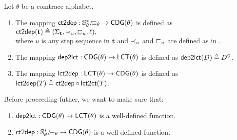 \documentclass{llncs}
\begin{document}
\begin{definition} Let $\theta$ be a comtrace alphabet. 
\begin{enumerate}
 \item The mapping  $\mathsf{ct2dep}:{\mathbb{S}_\theta^*}/\!{\equiv_{\theta}} \rightarrow \mathsf{CDG}(\theta)$ is defined as\smallskip\\
 \mbox{\hspace{3.5cm}} $\mathsf{ct2dep}(\mathbf{t}) \triangleq (\Sigma_{\mathbf{t}},\prec_{u},\sqsubset_{u},\ell),$ \smallskip\\
where $u$ is any step sequence in $\mathbf{t}$ and $\prec_{u}$ and $\sqsubset_{u}$ are defined as in . 
 \item The mapping  $\mathsf{dep2lct}:\mathsf{CDG}(\theta)\rightarrow \mathsf{LCT}(\theta)$ is defined as  $\mathsf{dep2lct}(D) \triangleq D^{\lozenge}$.
 \item The mapping  $\mathsf{lct2dep}:\mathsf{LCT}(\theta)\rightarrow \mathsf{CDG}(\theta)$ is defined as\smallskip\\
 \mbox{\hspace{3.2cm}}   $\mathsf{lct2dep}(T)\triangleq \mathsf{ct2dep} \circ \mathsf{lct2ct} (T) $. \EOD
\end{enumerate}
\label{def:drepmaps}
\end{definition}

Before proceeding futher, we want to make sure that:
\begin{lemma}
\begin{enumerate}
\item $\mathsf{dep2lct}:\mathsf{CDG}(\theta)\rightarrow \mathsf{LCT}(\theta)$ is a well-defined function.
\item $\mathsf{ct2dep}:{\mathbb{S}_\theta^*}/\!{\equiv_{\theta}} \rightarrow \mathsf{CDG}(\theta)$ is a well-defined function.
\end{enumerate}
\end{lemma}
\end{document}

